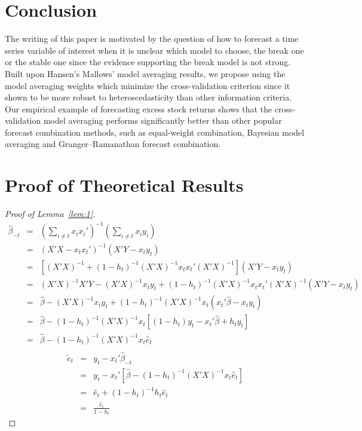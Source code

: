 \documentclass[a4paper,12pt]{article}
\begin{document}
\section{Conclusion}
The writing of this paper is motivated by the question of how to forecast a time series variable of interest when it is unclear which model to choose, the break one or the stable one since the evidence supporting the break model is not strong. Built upon Hansen's Mallows' model averaging results, we propose using the model averaging weights which minimize the cross-validation criterion since it shown to be more robust to heteroscedasticity than other information criteria. Our empirical example of forecasting excess stock returns shows that the cross-validation model averaging performs significantly better than other popular forecast combination methods, such as equal-weight combination, Bayesian model averaging and Granger--Ramanathan forecast combination.
\appendix
\section{Proof of Theoretical Results}
\begin{proof}[Proof of Lemma~\ref{lem:1}]
\begin{eqnarray}
 \hat{\beta}_{-t}
& = & (\sum_{i \neq t} x_i x_i')^{-1} (\sum_{i \neq t} x_i y_i) \nonumber \\
& = & (X'X - x_t x_t')^{-1} (X'Y - x_t y_t) \nonumber \\
& = & [(X'X)^{-1} + (1 - h_t)^{-1} (X'X)^{-1} x_t x_t' (X'X)^{-1}] (X'Y - x_t y_t)  \nonumber \\
& = & (X'X)^{-1}X'Y - (X'X)^{-1} x_t y_t + (1 - h_t)^{-1} (X'X)^{-1} x_t x_t' (X'X)^{-1} (X'Y - x_t y_t)  \nonumber \\
& = & \hat{\beta} - (X'X)^{-1} x_t y_t + (1 - h_t)^{-1} (X'X)^{-1} x_t (x_t' \hat{\beta} - x_t y_t) \nonumber \\
& = & \hat{\beta} - (1 - h_t)^{-1} (X'X)^{-1} x_t [(1 - h_t) y_t - x_t' \hat{\beta} + h_t y_t] \nonumber \\
& = & \hat{\beta} - (1 - h_t)^{-1} (X'X)^{-1} x_t \hat{e}_t  \nonumber \\
\end{eqnarray}
\begin{eqnarray}
 \tilde{e}_t
& = & y_t -x_t' \hat{\beta}_{-t} \nonumber \\
& = & y_t - x_t' [\hat{\beta} - (1 - h_t)^{-1} (X'X)^{-1} x_t \hat{e}_t ] \nonumber \\
& = & \hat{e}_t  + (1 - h_t)^{-1} h_t \hat{e}_t  \nonumber \\
& = & \frac{\hat{e}_t }{1 - h_t}
\end{eqnarray}
\end{proof}
\end{document}
